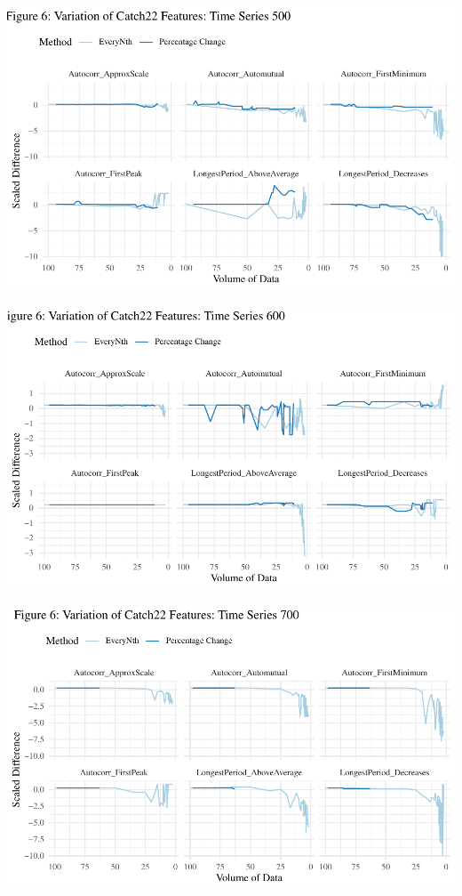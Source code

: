 \documentclass{article}
\begin{document}
\includegraphics{210431461_CSC8639_Dissertation_files/figure-latex/Catch22Variation500-1.pdf}

\includegraphics{210431461_CSC8639_Dissertation_files/figure-latex/Catch22Variation600-1.pdf}

\includegraphics{210431461_CSC8639_Dissertation_files/figure-latex/Catch22Variation700-1.pdf}
\end{document}
